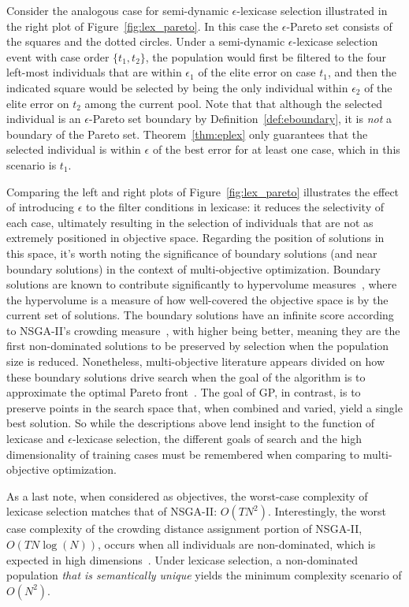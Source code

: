 \documentclass[twoside]{article}
\begin{document}
Consider the analogous case for semi-dynamic $\epsilon$-lexicase selection illustrated in the right plot of Figure~\ref{fig:lex_pareto}. In this case the $\epsilon$-Pareto set consists of the squares and the dotted circles. Under a semi-dynamic $\epsilon$-lexicase selection event with case order $\{t_1, t_2\}$, the population would first be filtered to the four left-most individuals that are within $\epsilon_1$ of the elite error on case $t_1$, and then the indicated square would be selected by being the only individual within $\epsilon_2$ of the elite error on $t_2$ among the current pool. Note that that although the selected individual is an $\epsilon$-Pareto set boundary by Definition~\ref{def:eboundary}, it is {\it not} a boundary of the Pareto set. Theorem~\ref{thm:eplex} only guarantees that the selected individual is within $\epsilon$ of the best error for at least one case, which in this scenario is $t_1$. 

Comparing the left and right plots of Figure~\ref{fig:lex_pareto} illustrates the effect of introducing $\epsilon$ to the filter conditions in lexicase: it reduces the selectivity of each case, ultimately resulting in the selection of individuals that are not as extremely positioned in objective space. Regarding the position of solutions in this space, it's worth noting the significance of boundary solutions (and near boundary solutions) in the context of multi-objective optimization. Boundary solutions are known to contribute significantly to hypervolume measures~\citep{deb_evaluating_2005}, where the hypervolume is a measure of how well-covered the objective space is by the current set of solutions. The boundary solutions have an infinite score according to NSGA-II's crowding measure~\citep{schoenauer_fast_2000}, with higher being better, meaning they are the first non-dominated solutions to be preserved by selection when the population size is reduced. Nonetheless, multi-objective literature appears divided on how these boundary solutions drive search when the goal of the algorithm is to approximate the optimal Pareto front~\citep{wagner_pareto-_2007}. The goal of GP, in contrast, is to preserve points in the search space that, when combined and varied, yield a single best solution. So while the descriptions above lend insight to the function of lexicase and $\epsilon$-lexicase selection, the different goals of search and the high dimensionality of training cases must be remembered when comparing to multi-objective optimization. 

As a last note, when considered as objectives, the worst-case complexity of lexicase selection matches that of NSGA-II: $O(TN^2)$. Interestingly, the worst case complexity of the crowding distance assignment portion of NSGA-II, $O(TN\log(N))$, occurs when all individuals are non-dominated, which is expected in high dimensions~\citep{farina_optimal_2002, wagner_pareto-_2007}. Under lexicase selection, a non-dominated population {\it that is semantically unique} yields the minimum complexity scenario of $O(N^2)$. 
\end{document}

